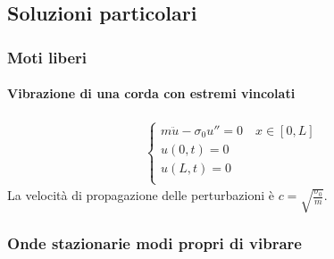 \documentclass[letterpaper,10pt,italian]{jupyterBook}
\begin{document}
\subsection{Soluzioni particolari}
\label{\detokenize{ch/waves/waves-notes:soluzioni-particolari}}

\subsubsection{Moti liberi}
\label{\detokenize{ch/waves/waves-notes:moti-liberi}}

\paragraph{Vibrazione di una corda con estremi vincolati}
\label{\detokenize{ch/waves/waves-notes:vibrazione-di-una-corda-con-estremi-vincolati}}\begin{equation*}
\begin{split}
\begin{cases}
  m \ddot{u} - \sigma_0 u'' = 0 \quad x \in [0,L] \\
  u(0,t) = 0 \\
  u(L,t) = 0 \\
\end{cases}
\end{split}
\end{equation*}
\sphinxAtStartPar
La velocità di propagazione delle perturbazioni è \(c = \sqrt{\frac{\sigma_0}{m}}\).
\subsubsection*{Onde stazionarie \sphinxhyphen{} modi propri di vibrare}
\end{document}
